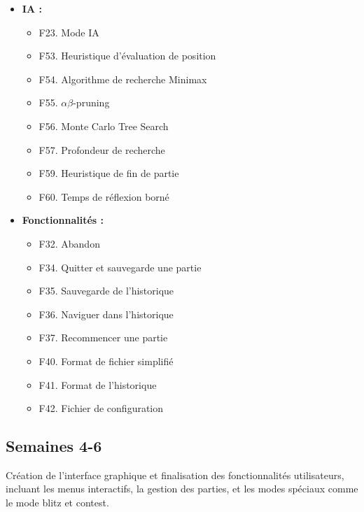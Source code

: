 \documentclass{article}
\begin{document}
\begin{itemize}
    \item \textbf{IA :}
    \begin{itemize}
        \item F23. Mode IA
        \item F53. Heuristique d’évaluation de position
        \item F54. Algorithme de recherche Minimax
        \item F55. $\alpha\beta$-pruning
        \item F56. Monte Carlo Tree Search
        \item F57. Profondeur de recherche
        \item F59. Heuristique de fin de partie
        \item F60. Temps de réflexion borné
    \end{itemize}
    \item \textbf{Fonctionnalités :}
    \begin{itemize}
        \item F32. Abandon
        \item F34. Quitter et sauvegarde une partie
        \item F35. Sauvegarde de l’historique
        \item F36. Naviguer dans l’historique
        \item F37. Recommencer une partie
        \item F40. Format de fichier simplifié
        \item F41. Format de l’historique
        \item F42. Fichier de configuration
    \end{itemize}
\end{itemize}

\subsection{Semaines 4-6}

Création de l'interface graphique et finalisation des fonctionnalités utilisateurs, incluant les menus interactifs, la gestion des parties, et les modes spéciaux comme le mode blitz et contest.
\end{document}

